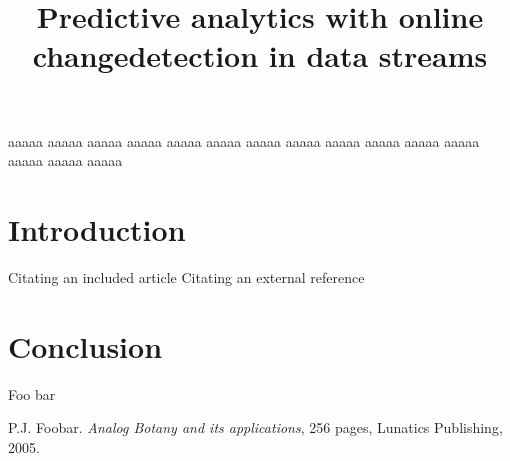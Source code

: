 \documentclass[licentiate,latin9,lot,loar,lof,shortloft,index]{jydiss}
\title{Predictive analytics with online changedetection in data streams}
\begin{document}
\preface
{} aaaaa aaaaa aaaaa aaaaa aaaaa aaaaa aaaaa aaaaa aaaaa aaaaa aaaaa aaaaa aaaaa aaaaa 
\acknowledgements
aaaaa 
\mainmatter

\chapter{Introduction}
Citating an included article \cite{sha1}
Citating an external reference \cite{foo}



%
%
%

%
%
%
\chapter{Conclusion}
\tailmatter
\finnishsummary
Foo bar
%
%
\begin{thebibliography}{Foo05}
 P.J. Foobar. \textit{Analog Botany and its applications},
256 pages, Lunatics Publishing, 2005.
\end{thebibliography}
\appendices
{}
\end{document}
